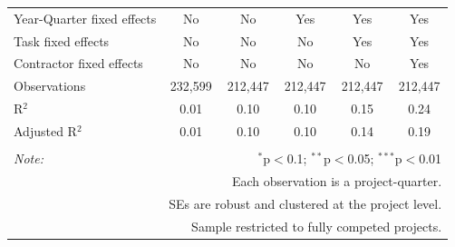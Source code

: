 \documentclass[
]{article}
\begin{document}
\begin{table}[H]
\begin{tabular}{@{\extracolsep{-2pt}}lccccc}
Year-Quarter fixed effects & No & No & Yes & Yes & Yes \\ 
Task fixed effects & No & No & No & Yes & Yes \\ 
Contractor fixed effects & No & No & No & No & Yes \\ 
Observations & 232,599 & 212,447 & 212,447 & 212,447 & 212,447 \\ 
R$^{2}$ & 0.01 & 0.10 & 0.10 & 0.15 & 0.24 \\ 
Adjusted R$^{2}$ & 0.01 & 0.10 & 0.10 & 0.14 & 0.19 \\ 
\hline 
\hline \\[-1.8ex] 
\textit{Note:}  & \multicolumn{5}{r}{$^{*}$p$<$0.1; $^{**}$p$<$0.05; $^{***}$p$<$0.01} \\ 
 & \multicolumn{5}{r}{Each observation is a project-quarter.} \\ 
 & \multicolumn{5}{r}{SEs are robust and clustered at the project level.} \\ 
 & \multicolumn{5}{r}{Sample restricted to fully competed projects.} \\ 
\end{tabular} 
\end{table}
\end{document}
